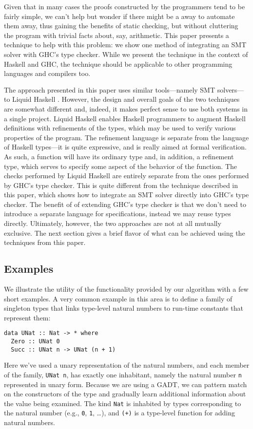 \documentclass{sigplanconf}
\begin{document}
Given that in many cases the proofs constructed by the programmers
tend to be fairly simple, we can't help but wonder if there might
be a away to automate them away, thus gaining the benefits of
static checking, but without cluttering the program with trivial
facts about, say, arithmetic.  This paper presents a technique
to help with this problem: we show one method of integrating
an SMT solver with GHC's type checker.  While we present
the technique in the context of Haskell and GHC, the technique
should be applicable to other programming languages and compilers too.

The approach presented in this paper uses similar tools---namely
SMT solvers---to Liquid Haskell \cite{liquid-haskell}. However,
the design and overall goals of the two techniques are somewhat
different and, indeed, it makes perfect sense to use both systems
in a single project.  Liquid Haskell enables Haskell programmers
to augment Haskell definitions with refinements of the types,
which may be used to verify various properties of the program.
The refinement language is separate from the language of Haskell
types---it is quite expressive, and is really aimed at formal
verification.  As such, a function will have its ordinary
type and, in addition, a refinement type, which serves to specify
some aspect of the behavior of the function.  The checks performed
by Liquid Haskell are entirely separate from the ones performed
by GHC's type checker.  This is quite different from the
technique described in this paper, which shows how to integrate
an SMT solver directly into GHC's type checker.  The benefit of
of extending GHC's type checker is that we don't need to
introduce a separate language for specifications, instead
we may reuse types directly.  Ultimately, however, the two
approaches are not at all mutually exclusive.  The next
section gives a brief flavor of what can be achieved using
the techniques from this paper.

\subsection{Examples}

We illustrate the utility of the functionality provided by our
algorithm with a few short examples.  A very common example in
this area is to define a family of singleton types that links
type-level natural numbers to run-time constants that represent
them:
\begin{Verbatim}
data UNat :: Nat -> * where
  Zero :: UNat 0
  Succ :: UNat n -> UNat (n + 1)
\end{Verbatim}
Here we've used a unary representation of the natural numbers,
and each member of the family, \Verb"UNat n", has exactly one
inhabitant, namely the natural number \Verb"n" represented in
unary form.  Because we are using a GADT, we can pattern match
on the constructors of the type and gradually learn additional
information about the value being examined.  The kind \Verb"Nat"
is inhabited by types corresponding to the natural number
(e.g., \Verb"0", \Verb"1", \dots), and \Verb"(+)" is a type-level
function for adding natural numbers.
\end{document}
